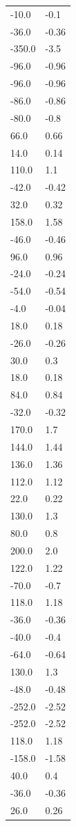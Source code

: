 \begin{longtable}{ll}
-10.0 & -0.1 \\
-36.0 & -0.36 \\
-350.0 & -3.5 \\
-96.0 & -0.96 \\
-96.0 & -0.96 \\
-86.0 & -0.86 \\
-80.0 & -0.8 \\
66.0 & 0.66 \\
14.0 & 0.14 \\
110.0 & 1.1 \\
-42.0 & -0.42 \\
32.0 & 0.32 \\
158.0 & 1.58 \\
-46.0 & -0.46 \\
96.0 & 0.96 \\
-24.0 & -0.24 \\
-54.0 & -0.54 \\
-4.0 & -0.04 \\
18.0 & 0.18 \\
-26.0 & -0.26 \\
30.0 & 0.3 \\
18.0 & 0.18 \\
84.0 & 0.84 \\
-32.0 & -0.32 \\
170.0 & 1.7 \\
144.0 & 1.44 \\
136.0 & 1.36 \\
112.0 & 1.12 \\
22.0 & 0.22 \\
130.0 & 1.3 \\
80.0 & 0.8 \\
200.0 & 2.0 \\
122.0 & 1.22 \\
-70.0 & -0.7 \\
118.0 & 1.18 \\
-36.0 & -0.36 \\
-40.0 & -0.4 \\
-64.0 & -0.64 \\
130.0 & 1.3 \\
-48.0 & -0.48 \\
-252.0 & -2.52 \\
-252.0 & -2.52 \\
118.0 & 1.18 \\
-158.0 & -1.58 \\
40.0 & 0.4 \\
-36.0 & -0.36 \\
26.0 & 0.26 \\

\end{longtable}
